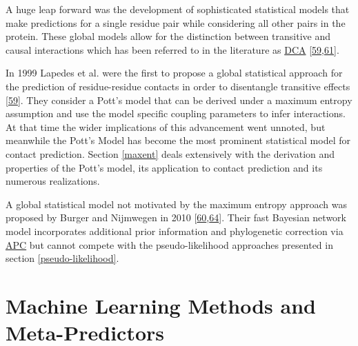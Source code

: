 \documentclass[11pt,a4paper,twoside]{book}
\theoremstyle{definition}
\theoremstyle{definition}
\theoremstyle{remark}
\begin{document}
A huge leap forward was the development of sophisticated statistical
models that make predictions for a single residue pair while considering
all other pairs in the protein. These global models allow for the
distinction between transitive and causal interactions which has been
referred to in the literature as \protect\hyperlink{abbrev}{DCA}
{[}\protect\hyperlink{ref-Lapedes1999}{59},\protect\hyperlink{ref-Weigt2009}{61}{]}.

In 1999 Lapedes et al. were the first to propose a global statistical
approach for the prediction of residue-residue contacts in order to
disentangle transitive effects
{[}\protect\hyperlink{ref-Lapedes1999}{59}{]}. They consider a Pott's
model that can be derived under a maximum entropy assumption and use the
model specific coupling parameters to infer interactions. At that time
the wider implications of this advancement went unnoted, but meanwhile
the Pott's Model has become the most prominent statistical model for
contact prediction. Section \ref{maxent} deals extensively with the
derivation and properties of the Pott's model, its application to
contact prediction and its numerous realizations.

A global statistical model not motivated by the maximum entropy approach
was proposed by Burger and Nijmwegen in 2010
{[}\protect\hyperlink{ref-Burger2010}{60},\protect\hyperlink{ref-Burger2008}{64}{]}.
Their fast Bayesian network model incorporates additional prior
information and phylogenetic correction via
\protect\hyperlink{abbrev}{APC} but cannot compete with the
pseudo-likelihood approaches presented in section
\ref{pseudo-likelihood}.

\section{Machine Learning Methods and
Meta-Predictors}\label{meta-predictors}
\end{document}
